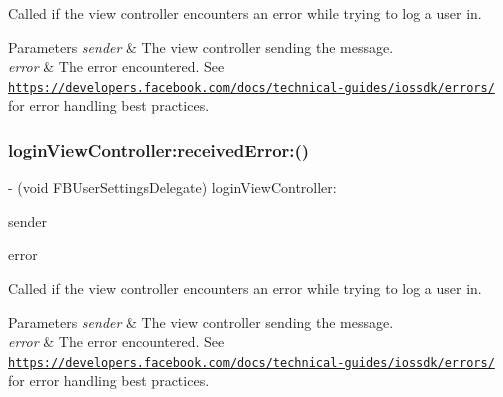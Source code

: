 Called if the view controller encounters an error while trying to log a user in.


\begin{DoxyParams}{Parameters}
{\em sender} & The view controller sending the message. \\
\hline
{\em error} & The error encountered.  See \href{https://developers.facebook.com/docs/technical-guides/iossdk/errors/}{\tt https\+://developers.\+facebook.\+com/docs/technical-\/guides/iossdk/errors/} for error handling best practices. \\
\hline
\end{DoxyParams}
\mbox{\label{protocolFBUserSettingsDelegate_01-p_aa7340081c0402e123cdde904f5cf2c91}} 
\subsubsection{\texorpdfstring{login\+View\+Controller\+:received\+Error\+:()}{loginViewController:receivedError:()}\hspace{0.1cm}{\footnotesize\ttfamily [3/5]}}
{\footnotesize\ttfamily -\/ (void F\+B\+User\+Settings\+Delegate) login\+View\+Controller\+: \begin{DoxyParamCaption}\item[{(id)}]{sender }\item[{receivedError:(N\+S\+Error $\ast$)}]{error }\end{DoxyParamCaption}\hspace{0.3cm}{\ttfamily [optional]}}

Called if the view controller encounters an error while trying to log a user in.


\begin{DoxyParams}{Parameters}
{\em sender} & The view controller sending the message. \\
\hline
{\em error} & The error encountered.  See \href{https://developers.facebook.com/docs/technical-guides/iossdk/errors/}{\tt https\+://developers.\+facebook.\+com/docs/technical-\/guides/iossdk/errors/} for error handling best practices. \\
\hline
\end{DoxyParams}
\mbox{\label{protocolFBUserSettingsDelegate_01-p_aa7340081c0402e123cdde904f5cf2c91}} 

